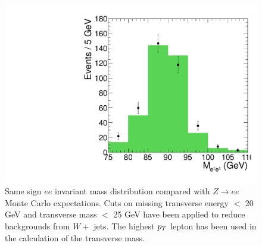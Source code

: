 \begin{figure}[h]
\begin{center}
\includegraphics[width=0.8\linewidth]{figs/qflip_data_mc_comp}
\caption{\label{fig:flipZee}
Same sign $ee$ invariant mass distribution compared with $Z \to ee$ Monte Carlo expectations.
Cuts on missing transverse energy $<$ 20 GeV and transverse mass
$<$ 25 GeV have been applied to reduce backgrounds from $W +$ jets.
The highest $p_T$ lepton has been used in the calculation of the transverse  mass.}
\end{center}
\end{figure}









